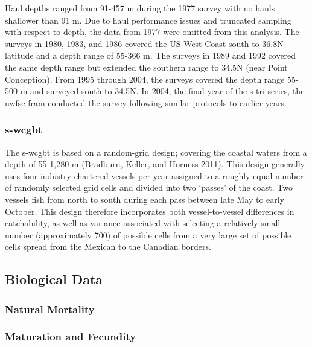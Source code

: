 \documentclass[11pt,
  english,
  letterpaper,
]{article}
\begin{document}
Haul depths ranged from 91-457 m during the 1977 survey with no hauls shallower than 91 m. Due to haul performance issues and truncated sampling with respect to depth, the data from 1977 were omitted from this analysis. The surveys in 1980, 1983, and 1986 covered the US West Coast south to 36.8\textdegree N latitude and a depth range of 55-366 m. The surveys in 1989 and 1992 covered the same depth range but extended the southern range to 34.5\textdegree N (near Point Conception). From 1995 through 2004, the surveys covered the depth range 55-500 m and surveyed south to 34.5\textdegree N. In 2004, the final year of the \gls{s-tri} series, the \gls{nwfsc} \gls{fram} conducted the survey following similar protocols to earlier years.

\hypertarget{section-3}{%
\subsubsection{\texorpdfstring{\acrlong{s-wcgbt}}{}}\label{section-3}}

The \Gls{s-wcgbt} is based on a random-grid design; covering the coastal waters from a depth of 55-1,280 m (Bradburn, Keller, and Horness 2011). This design generally uses four industry-chartered vessels per year assigned to a roughly equal number of randomly selected grid cells and divided into two `passes' of the coast. Two vessels fish from north to south during each pass between late May to early October. This design therefore incorporates both vessel-to-vessel differences in catchability, as well as variance associated with selecting a relatively small number (approximately 700) of possible cells from a very large set of possible cells spread from the Mexican to the Canadian borders.

\hypertarget{biological-data}{%
\subsection{Biological Data}\label{biological-data}}

\hypertarget{natural-mortality}{%
\subsubsection{Natural Mortality}\label{natural-mortality}}

\hypertarget{maturation-and-fecundity}{%
\subsubsection{Maturation and Fecundity}\label{maturation-and-fecundity}}
\end{document}
